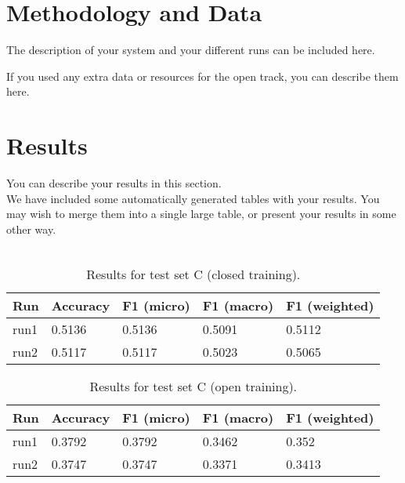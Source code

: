 \documentclass[11pt]{article}
\begin{document}
\section{Methodology and Data}

The description of your system and your different runs can be included here.

If you used any extra data or resources for the open track, you can describe them here.

\section{Results}
\label{sec:results}

You can describe your results in this section.
\\

We have included some automatically generated tables with your results. You may wish to merge them into a single large table, or present your results in some other way.
\\\\

\begin{table}[h]
\center
\begin{tabular}{|lllll|}
\hline
\bf Run & \bf Accuracy & \bf F1 (micro) & \bf F1 (macro) & \bf F1 (weighted) \\
\hline
run1 & 0.5136 & 0.5136 & 0.5091 & 0.5112 \\
run2 & 0.5117 & 0.5117 & 0.5023 & 0.5065 \\
\hline
\end{tabular}
\caption{Results for test set C (closed training).}
\label{tab:results-C-closed}
\end{table}

\begin{table}[h]
\center
\begin{tabular}{|lllll|}
\hline
\bf Run & \bf Accuracy & \bf F1 (micro) & \bf F1 (macro) & \bf F1 (weighted) \\
\hline
run1 & 0.3792 & 0.3792 & 0.3462 & 0.352 \\
run2 & 0.3747 & 0.3747 & 0.3371 & 0.3413 \\
\hline
\end{tabular}
\caption{Results for test set C (open training).}
\label{tab:results-C-open}
\end{table}
\end{document}
